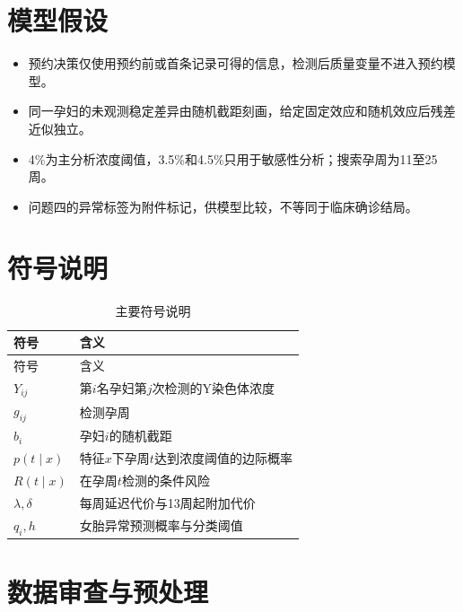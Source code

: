 \documentclass[withoutpreface,bwprint]{format}
\begin{document}
\section{模型假设}
\begin{itemize}[itemindent=2em]
\item 预约决策仅使用预约前或首条记录可得的信息，检测后质量变量不进入预约模型。
\item 同一孕妇的未观测稳定差异由随机截距刻画，给定固定效应和随机效应后残差近似独立。
\item 4\%为主分析浓度阈值，3.5\%和4.5\%只用于敏感性分析；搜索孕周为11至25周。
\item 问题四的异常标签为附件标记，供模型比较，不等同于临床确诊结局。
\end{itemize}

\section{符号说明}
\begin{longtable}{>{\centering\arraybackslash}p{}>{\centering\arraybackslash}p{}}
\caption{主要符号说明}\label{tab:symbol}\\\toprule
符号&含义\\\midrule\endfirsthead\toprule 符号&含义\\\midrule\endhead\bottomrule\endfoot
$Y_{ij}$&第$i$名孕妇第$j$次检测的Y染色体浓度\\
$g_{ij}$&检测孕周\\
$b_i$&孕妇$i$的随机截距\\
$p(t\mid x)$&特征$x$下孕周$t$达到浓度阈值的边际概率\\
$R(t\mid x)$&在孕周$t$检测的条件风险\\
$\lambda,\delta$&每周延迟代价与13周起附加代价\\
$q_i,h$&女胎异常预测概率与分类阈值\\
\end{longtable}

\section{数据审查与预处理}
\end{document}
